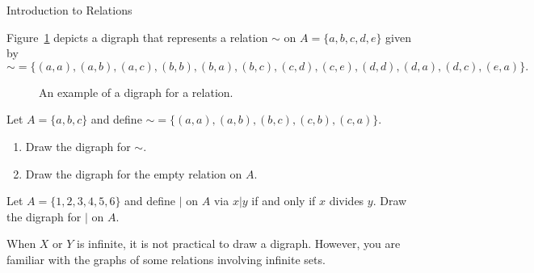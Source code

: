 \begin{section}{Introduction to Relations}
\begin{example}\label{ex:digraph}
Figure~\ref{fig:digraph} depicts a digraph that represents a relation $\sim$ on $A=\{a,b,c,d,e\}$ given by
\[
{\sim}=\{(a,a),(a,b),(a,c),(b,b),(b,a),(b,c),(c,d),(c,e),(d,d),(d,a),(d,c),(e,a)\}.
\]

\begin{figure}[h!]
\begin{center}
\caption{An example of a digraph for a relation.}\label{fig:digraph}
\end{center}
\end{figure}

\end{example}

\begin{problem}
Let $A=\{a,b,c\}$ and define ${\sim}=\{(a,a),(a,b),(b,c),(c,b),(c,a)\}$.  
\begin{enumerate}[label=\textrm{(\alph*)}]
\item Draw the digraph for $\sim$.
\item Draw the digraph for the empty relation on $A$.
\end{enumerate}
\end{problem}

\begin{problem}
Let $A=\{1,2,3,4,5,6\}$ and define $|$ on $A$ via $x|y$ if and only if $x$ divides $y$.  Draw the digraph for $|$ on $A$.
\end{problem}

When $X$ or $Y$ is infinite, it is not practical to draw a digraph.  However, you are familiar with the graphs of some relations involving infinite sets.


\end{section}
